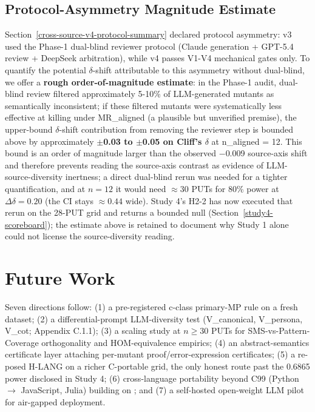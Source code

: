 \documentclass[manuscript,screen,review]{acmart}
\begin{document}
\subsection{Protocol-Asymmetry Magnitude Estimate}\label{r13-protocol-asymmetry-magnitude-estimate}

Section~\ref{cross-source-v4-protocol-summary} declared protocol asymmetry: v3 used the Phase-1 dual-blind
reviewer protocol (Claude generation + GPT-5.4 review + DeepSeek
arbitration), while v4 passes V1-V4 mechanical gates only. To quantify
the potential $\delta$-shift attributable to this asymmetry without dual-blind,
we offer a \textbf{rough order-of-magnitude estimate}: in the Phase-1
audit, dual-blind review filtered approximately 5-10\% of LLM-generated
mutants as semantically inconsistent; if these filtered mutants were
systematically less effective at killing under MR\_aligned (a plausible
but unverified premise), the upper-bound $\delta$-shift contribution from
removing the reviewer step is bounded above by approximately
\textbf{$\pm$0.03 to $\pm$0.05 on Cliff's $\delta$} at n\_aligned = 12. This bound is
an order of magnitude larger than the observed $-$0.009 source-axis shift
and therefore prevents reading the source-axis contrast as evidence of
LLM-source-diversity inertness; a direct dual-blind rerun was needed for
a tighter quantification, and at $n = 12$ it would need $\approx 30$ PUTs
for 80\% power at $\Delta\delta = 0.20$ (the CI stays $\approx 0.44$ wide).
Study 4's H2-2 has now executed that rerun on the 28-PUT grid and returns a
bounded null (Section~\ref{study4-scoreboard}); the estimate above is
retained to document why Study 1 alone could not license the
source-diversity reading.


\section{Future Work}\label{future-work-and-p-series-roadmap}

Seven directions follow: (1) a pre-registered c-class primary-MP rule on a fresh
dataset; (2) a differential-prompt LLM-diversity test (V\_canonical, V\_persona,
V\_cot; Appendix C.1.1); (3) a scaling study at $n \geq 30$ PUTs for
SMS-vs-Pattern-Coverage orthogonality and HOM-equivalence empirics; (4) an
abstract-semantics certificate layer attaching per-mutant
proof/error-expression certificates;
(5) a re-posed H-LANG on a richer C-portable grid, the only honest route past
the 0.6865 power disclosed in Study 4; (6) cross-language
portability beyond C99 (Python $\to$ JavaScript, Julia) building on
\citet{tip2025llmorpheus}; and (7) a self-hosted open-weight LLM
pilot for air-gapped deployment.
\end{document}
